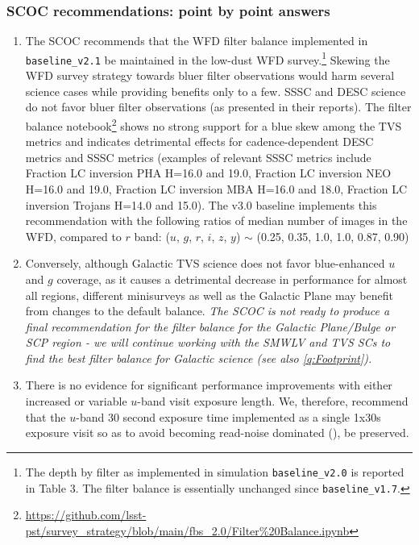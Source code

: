 \subsubsection{SCOC recommendations: point by point answers }\label{rec:filterdist}

\begin{enumerate}

\item The SCOC recommends that the WFD filter balance implemented in \texttt{baseline\_v2.1}  be maintained in the low-dust WFD survey.\footnote{The depth by filter as implemented in simulation \texttt{baseline\_v2.0} is reported in  Table 3. The filter balance is essentially unchanged since \texttt{baseline\_v1.7}.} Skewing the WFD survey strategy towards bluer filter observations would harm several science cases while providing benefits only to a few. 
SSSC and DESC science do not favor bluer filter observations (as presented in their reports).
The filter balance notebook\footnote{
\url{https://github.com/lsst-pst/survey_strategy/blob/main/fbs_2.0/Filter\%20Balance.ipynb}
} shows no strong support for a blue skew among the TVS metrics and indicates detrimental effects for cadence-dependent DESC metrics and SSSC metrics (examples of relevant SSSC metrics include Fraction LC inversion PHA H=16.0 and 19.0, Fraction LC inversion NEO H=16.0 and 19.0, Fraction LC inversion MBA H=16.0 and 18.0, Fraction LC inversion Trojans H=14.0 and 15.0). The v3.0 baseline implements this recommendation with the following ratios of median number of images in the WFD, compared to $r$ band: ($u$, $g$, $r$, $i$, $z$, $y$) $\sim$ (0.25, 0.35, 1.0, 1.0, 0.87, 0.90)


\item Conversely, although Galactic TVS science does not favor blue-enhanced $u$ and $g$ coverage, as it causes a detrimental decrease in performance for almost all regions,  different minisurveys as well as the Galactic Plane may benefit from changes to the default balance. \emph{The SCOC is not ready to produce a final recommendation for the filter balance for the Galactic Plane/Bulge or SCP region - we will continue working with the SMWLV and TVS SCs to find the best filter balance for Galactic science (see also \autoref{q:Footprint}).}

\item There is no evidence for significant performance improvements with either increased or variable $u$-band visit exposure length. We, therefore, recommend that the $u$-band 30 second exposure time implemented as a single 1x30s exposure visit so as to avoid becoming read-noise dominated (),  be preserved.


\end{enumerate}
